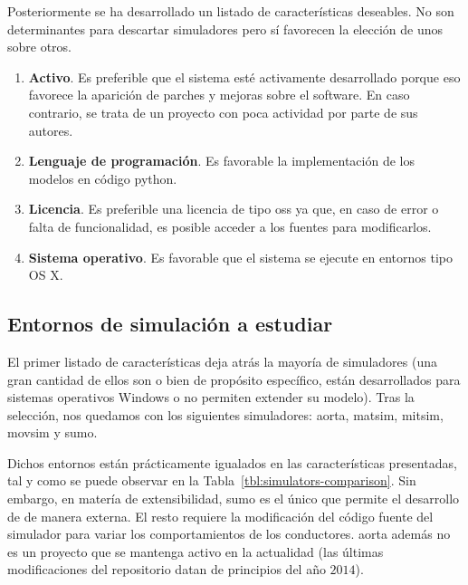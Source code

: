 Posteriormente se ha desarrollado un listado de características deseables. No son determinantes para descartar simuladores pero sí favorecen la elección de unos sobre otros.

\begin{enumerate}
	\item \textbf{Activo}. Es preferible que el sistema esté activamente desarrollado porque eso favorece la aparición de parches y mejoras sobre el software. En caso contrario, se trata de un proyecto con poca actividad por parte de sus autores.
	\item \textbf{Lenguaje de programación}. Es favorable la implementación de los modelos en código \gls{python}.
	\item \textbf{Licencia}. Es preferible una licencia de tipo \Ac{oss} ya que, en caso de error o falta de funcionalidad, es posible acceder a los fuentes para modificarlos.
	\item \textbf{Sistema operativo}. Es favorable que el sistema se ejecute en entornos tipo OS X.
\end{enumerate}

\subsection{Entornos de simulación a estudiar}

El primer listado de características deja atrás la mayoría de simuladores (una gran cantidad de ellos son o bien de propósito específico, están desarrollados para sistemas operativos Windows o no permiten extender su modelo). Tras la selección, nos quedamos con los siguientes simuladores: \gls{aorta}, \gls{matsim}, \gls{mitsim}, \gls{movsim} y \gls{sumo}.

Dichos entornos están prácticamente igualados en las características presentadas, tal y como se puede observar en la Tabla~\ref{tbl:simulators-comparison}. Sin embargo, en matería de extensibilidad, \gls{sumo} es el único que permite el desarrollo de  de manera externa. El resto requiere la modificación del código fuente del simulador para variar los comportamientos de los conductores. \gls{aorta} además no es un proyecto que se mantenga activo en la actualidad (las últimas modificaciones del repositorio datan de principios del año $2014$).

